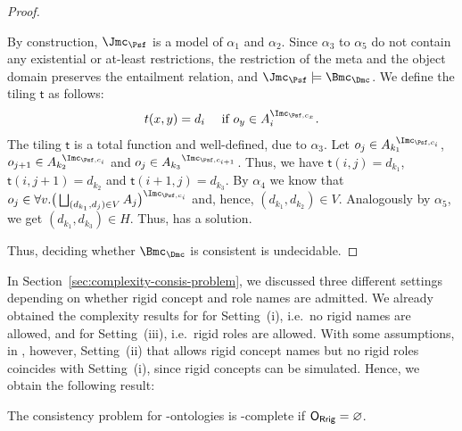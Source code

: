 \begin{proof}
\begin{claimproof}
    By construction, $\J_{\Psf}$ is a model of $\alpha_{1}$ and $\alpha_{2}$. Since $\alpha_{3}$ to
    $\alpha_{5}$ do not contain any existential or at-least restrictions, the restriction of the
    meta and the object domain preserves the entailment relation, and
    $\J_{\Psf}\models\Bmc_{\Dmc}$. We define the tiling $\mathsf{t}$ as follows:
    \begin{align*}
      t(x,y) = d_{i} \quad\text{ if $o_{y} \in A_{i}^{\I_{\Psf,c_{x}}}$}.
    \end{align*}
    The tiling $\mathsf{t}$ is a total function and well-defined, due to $\alpha_{3}$. Let
    $o_{j} \in {A_{k_{1}}}^{\!\!\!\I_{\Psf,c_{i}}}$,
    $o_{j+1} \in {A_{k_{2}}}^{\!\!\!\I_{\Psf,c_{i}}}$ and
    $o_{j} \in {A_{k_{3}}}^{\I_{\Psf,c_{i+1}}}$. Thus, we have $\mathsf{t}(i,j) = d_{k_{1}}$,
    $\mathsf{t}(i,j+1) = d_{k_{2}}$ and $\mathsf{t}(i+1,j) = d_{k_{3}}$. By $\alpha_{4}$ we know
    that
    $o_{j} \in \smash{\forall v.\big(\bigsqcup_{(d_{k_{1}},d_{j})\in V}
      A_{j}\big)^{\I_{\Psf,c_{i}}}}$ and, hence, $(d_{k_{1}}, d_{k_{2}})\in V$. Analogously by
    $\alpha_{5}$, we get $(d_{k_{1}}, d_{k_{3}})\in H$. Thus, \Dmc has a solution.
  \end{claimproof}

  Thus, deciding whether $\Bmc_{\Dmc}$ is consistent is undecidable.
\end{proof}

In Section~\ref{sec:complexity-consis-problem}, we discussed three different settings depending on
whether rigid concept and role names are admitted. We already obtained the complexity results for
\LMLOplus for Setting~(i), i.e.~no rigid names are allowed, and for Setting~(iii), i.e.~rigid roles
are allowed.  With some assumptions, in \LMLOplus, however, Setting~(ii) that allows rigid concept
names but no rigid roles coincides with Setting~(i), since rigid concepts can be simulated. Hence,
we obtain the following result:

\begin{theorem}
  The consistency problem for \SHOISHOIplus-ontologies is \TwoExpTime-complete if $\mathsf{O_{Rrig}}=\varnothing$.
\end{theorem}

